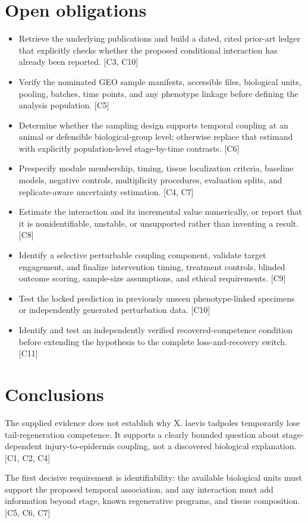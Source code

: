 \documentclass[11pt]{article}
\begin{document}
\section{Open obligations}
\begin{itemize}
\item Retrieve the underlying publications and build a dated, cited prior-art ledger that explicitly checks whether the proposed conditional interaction has already been reported. [C3, C10]
\item Verify the nominated GEO sample manifests, accessible files, biological units, pooling, batches, time points, and any phenotype linkage before defining the analysis population. [C5]
\item Determine whether the sampling design supports temporal coupling at an animal or defensible biological-group level; otherwise replace that estimand with explicitly population-level stage-by-time contrasts. [C6]
\item Prespecify module membership, timing, tissue localization criteria, baseline models, negative controls, multiplicity procedures, evaluation splits, and replicate-aware uncertainty estimation. [C4, C7]
\item Estimate the interaction and its incremental value numerically, or report that it is nonidentifiable, unstable, or unsupported rather than inventing a result. [C8]
\item Identify a selective perturbable coupling component, validate target engagement, and finalize intervention timing, treatment controls, blinded outcome scoring, sample-size assumptions, and ethical requirements. [C9]
\item Test the locked prediction in previously unseen phenotype-linked specimens or independently generated perturbation data. [C10]
\item Identify and test an independently verified recovered-competence condition before extending the hypothesis to the complete loss-and-recovery switch. [C11]
\end{itemize}
\section{Conclusions}
The supplied evidence does not establish why X. laevis tadpoles temporarily lose tail-regeneration competence. It supports a clearly bounded question about stage-dependent injury-to-epidermis coupling, not a discovered biological explanation. [C1, C2, C4]

The first decisive requirement is identifiability: the available biological units must support the proposed temporal association, and any interaction must add information beyond stage, known regenerative programs, and tissue composition. [C5, C6, C7]
\end{document}
